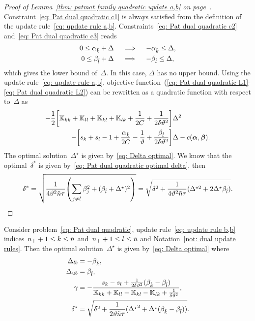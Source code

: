 \begin{proof}[Proof of Lemma~\ref{thm: patmat family quadratic update a,b} on page~\pageref{thm: patmat family quadratic update a,b}]
  Constraint~\eqref{eq: Pat dual quadratic c1} is always satisfied from the definition of the update rule~\eqref{eq: update rule a,b}. Constraints~\eqref{eq: Pat dual quadratic c2} and~\eqref{eq: Pat dual quadratic c3} reads
  \begin{align*}
    0 \leq \alpha_{\hat{k}} + \Delta
    & \quad \implies \quad
    - \alpha_{\hat{k}} \leq \Delta, \\
    0 \leq \beta_{\hat{l}} + \Delta
    & \quad \implies \quad
    - \beta_{\hat{l}} \leq \Delta, \\
  \end{align*}
  which gives the lower bound of~$\Delta.$ In this case, $\Delta$ has no upper bound. Using the update rule~\eqref{eq: update rule a,b}, objective function~(\ref{eq: Pat dual quadratic L1}-\ref{eq: Pat dual quadratic L2}) can be rewritten as a quadratic function with respect to~$\Delta$ as
  \begin{align*}
    - \frac{1}{2} \Brac[s]{\K_{kk} + \K_{ll} + \K_{kl} + \K_{lk} + \frac{1}{2C} + \frac{1}{2 \delta \vartheta^2}} & \Delta^2 \\
    - \Brac[s]{s_k + s_l - 1 + \frac{\alphak}{2C} - \frac{1}{\vartheta} + \frac{\betal}{2\delta\vartheta^2}} & \Delta
    - c(\bm{\alpha}, \bm{\beta}).
  \end{align*}
  The optimal solution~$\Delta^{\star}$ is given by~\eqref{eq: Delta optimal}. We know that the optimal~$\delta^*$ is given by~\eqref{eq: Pat dual quadratic optimal delta}, then
  \begin{equation*}
    \delta^*
      = \sqrt{\frac{1}{4\vartheta^2 \ntil \tau} \Brac{\sum_{j\neq \hat{l}} \beta_j^2 + (\betal + \Delta^\star)^2}}
      = \sqrt{\delta^2 + \frac{1}{4\vartheta^2 \ntil \tau} (\Delta^{\star2} + 2\Delta^\star \betal)}.
  \end{equation*}
\end{proof}

\begin{lemma}\label{thm: patmat family quadratic update b,b}
  Consider problem~\eqref{eq: Pat dual quadratic}, update rule~\eqref{eq: update rule b,b} indices~$n_{+} + 1 \leq k \leq \tilde{n}$ and~$n_{+} + 1 \leq l \leq \tilde{n}$ and Notation~\ref{not: dual update rules}. Then the optimal solution~$\Delta^{\star}$ is given by~\eqref{eq: Delta optimal} where
  \begin{align*}
    \Delta_{lb} & = - \beta_{\hat{k}}, \\
    \Delta_{ub} & = \beta_{\hat{l}}, \\
    \gamma      & = -\frac{s_k - s_l + \frac{1}{2\delta \vartheta^2}(\beta_{\hat{k}} - \beta_{\hat{l}})}{\mathbb{K}_{kk} + \mathbb{K}_{ll} - \mathbb{K}_{kl} - \mathbb{K}_{lk} + \frac{1}{\delta \vartheta^2}}, \\
    \delta^{\star}  & = \sqrt{\delta^2 + \frac{1}{2 \vartheta \tilde{n} \tau}({\Delta^{\star}}^2 + \Delta^{\star} (\beta_{\hat{k}} - \beta_{\hat{l}}))}.
  \end{align*}
\end{lemma}


